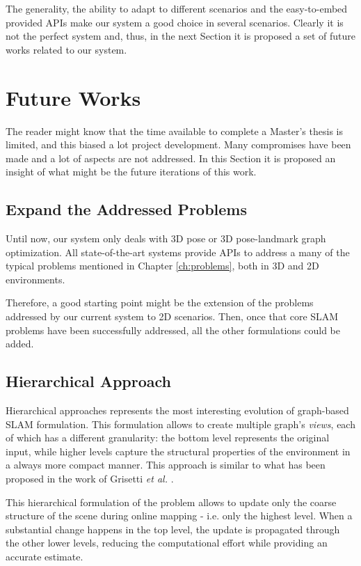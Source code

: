 \noindent The generality, the ability to adapt to different scenarios and the easy-to-embed provided APIs make our system a good choice in several scenarios. Clearly it is not the perfect system and, thus, in the next Section it is proposed a set of future works related to our system.

\section{Future Works}\label{sec:future_works}
The reader might know that the time available to complete a Master's thesis is limited, and this biased a lot project development. Many compromises have been made and a lot of aspects are not addressed. In this Section it is proposed an insight of what might be the future iterations of this work.

\subsection{Expand the Addressed Problems}
Until now, our system only deals with 3D pose or 3D pose-landmark graph optimization. All state-of-the-art systems provide APIs to address a many of the typical problems mentioned in Chapter \ref{ch:problems}, both in 3D and 2D environments.

Therefore, a good starting point might be the extension of the problems addressed by our current system to 2D scenarios. Then, once that core SLAM problems have been successfully addressed, all the other formulations could be added.

\subsection{Hierarchical Approach}
Hierarchical approaches represents the most interesting evolution of graph-based SLAM formulation. This formulation allows to create multiple graph's \textit{views}, each of which has a different granularity: the bottom level represents the original input, while higher levels capture the structural properties of the environment in a always more compact manner. This approach is similar to what has been proposed in the work of Grisetti \textit{et al.} \cite{grisetti2010hogman}.

This hierarchical formulation of the problem allows to update only the coarse structure of the scene during online mapping - i.e. only the highest level. When a substantial change happens in the top level, the update is propagated through the other lower levels, reducing the computational effort while providing an accurate estimate.